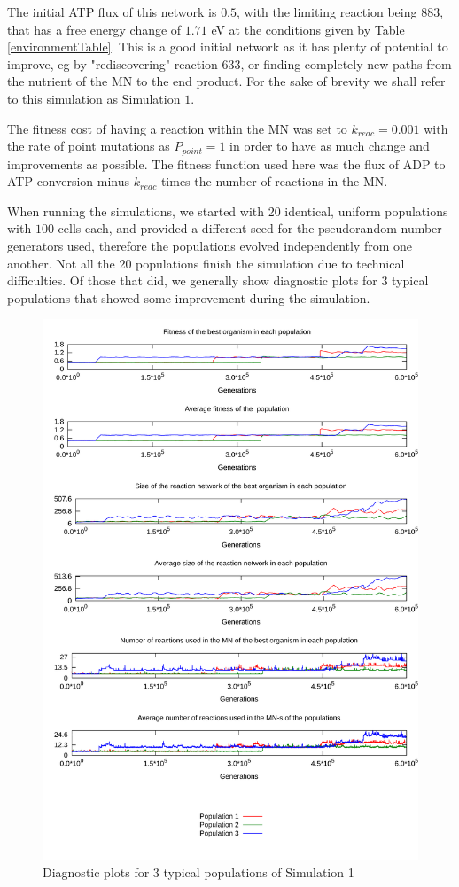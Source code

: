 \documentclass[a4paper,12pt]{article}
\begin{document}
The initial ATP flux of this network is $0.5$, with the limiting reaction being $883$, that has a free energy change of $1.71$ eV at the conditions given by Table \ref{environmentTable}. This is a good initial network as it has plenty of potential to improve, eg by "rediscovering" reaction $633$, or finding completely new paths from the nutrient of the MN to the end product. For the sake of brevity we shall refer to this simulation as Simulation $1$.

The fitness cost of having a reaction within the MN was set to $k_{reac}=0.001$ with the rate of point mutations as $P_{point}=1$ in order to have as much change and improvements as possible. The fitness function used here was the flux of ADP to ATP conversion minus $k_{reac}$ times the number of reactions in the MN.

When running the simulations, we started with 20 identical, uniform populations with $100$ cells each, and provided a different seed for the pseudorandom-number generators used, therefore the populations evolved independently from one another. Not all the 20 populations finish the simulation due to technical difficulties. Of those that did, we generally show diagnostic plots for 3 typical populations that showed some improvement during the simulation.




\begin{figure}[htpb]
	\centering
	\includegraphics[width=0.8\linewidth]{simulation1.pdf}
	\caption{Diagnostic plots for 3 typical populations of Simulation 1}
	\label{fig:simulation1}
\end{figure}
\end{document}
